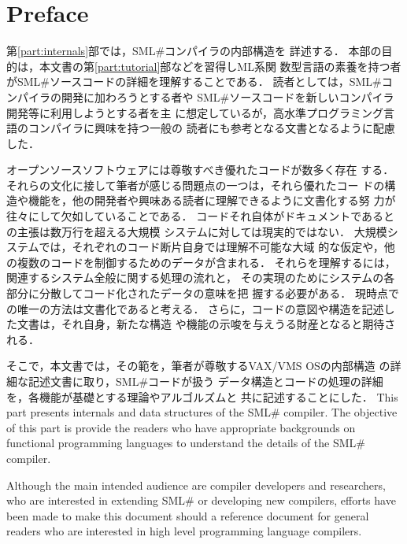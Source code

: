 \documentclass{jbook}
\newcommand{\txt}[2]{#2}
\newcommand{\smlsharp}{SML\#}
\begin{document}
\chapter*{\txt{序論}{Preface}}
\ifjp%
	第\ref{part:internals}部では，\smlsharp{}コンパイラの内部構造を
詳述する．
	本部の目的は，本文書の第\ref{part:tutorial}部などを習得しML系関
数型言語の素養を持つ者が\smlsharp{}ソースコードの詳細を理解することである．
	読者としては，\smlsharp{}コンパイラの開発に加わろうとする者や
\smlsharp{}ソースコードを新しいコンパイラ開発等に利用しようとする者を主
に想定しているが，高水準プログラミング言語のコンパイラに興味を持つ一般の
読者にも参考となる文書となるように配慮した．

	オープンソースソフトウェアには尊敬すべき優れたコードが数多く存在
する．
	それらの文化に接して筆者が感じる問題点の一つは，それら優れたコー
ドの構造や機能を，他の開発者や興味ある読者に理解できるように文書化する努
力が往々にして欠如していることである．
	コードそれ自体がドキュメントであるとの主張は数万行を超える大規模
システムに対しては現実的ではない．
	大規模システムでは，それぞれのコード断片自身では理解不可能な大域
的な仮定や，他の複数のコードを制御するためのデータが含まれる．
	それらを理解するには，関連するシステム全般に関する処理の流れと，
その実現のためにシステムの各部分に分散してコード化されたデータの意味を把
握する必要がある．
	現時点での唯一の方法は文書化であると考える．
	さらに，コードの意図や構造を記述した文書は，それ自身，新たな構造
や機能の示唆を与えうる財産となると期待される．

	そこで，本文書では，その範を，筆者が尊敬するVAX/VMS OSの内部構造
の詳細な記述文書\cite{Kenah:1984:VID:225}に取り，\smlsharp{}コードが扱う
データ構造とコードの処理の詳細を，各機能が基礎とする理論やアルゴルズムと
共に記述することにした．
\else%
	This part presents internals and data structures of the
\smlsharp{} compiler.
	The objective of this part is provide the readers who have
appropriate backgrounds on functional programming languages to
understand the details of the \smlsharp{} compiler.

	Although the main intended audience are compiler developers and
researchers, who are interested in extending \smlsharp{} or developing
new compilers, efforts have been made to make this document should a
reference document for general readers who are interested in high level
programming language compilers.
\end{document}
